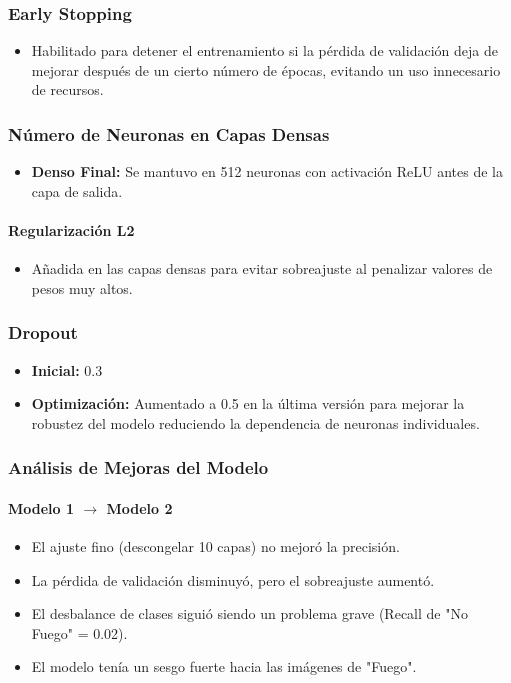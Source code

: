 \subsubsection{Early Stopping}
\begin{itemize}
    \item Habilitado para detener el entrenamiento si la pérdida de validación deja de mejorar después de un cierto número de épocas, evitando un uso innecesario de recursos.
\end{itemize}

\subsubsection{Número de Neuronas en Capas Densas}
\begin{itemize}
    \item \textbf{Denso Final:} Se mantuvo en 512 neuronas con activación ReLU antes de la capa de salida.
\end{itemize}

\paragraph{Regularización L2}
\begin{itemize}
    \item Añadida en las capas densas para evitar sobreajuste al penalizar valores de pesos muy altos.
\end{itemize}

\subsubsection{Dropout}
\begin{itemize}
    \item \textbf{Inicial:} 0.3
    \item \textbf{Optimización:} Aumentado a 0.5 en la última versión para mejorar la robustez del modelo reduciendo la dependencia de neuronas individuales.
\end{itemize}

\subsubsection{Análisis de Mejoras del Modelo}

\paragraph{Modelo 1 $\rightarrow$ Modelo 2}
\begin{itemize}
    \item El ajuste fino (descongelar 10 capas) no mejoró la precisión.
    \item La pérdida de validación disminuyó, pero el sobreajuste aumentó.
    \item El desbalance de clases siguió siendo un problema grave (Recall de "No Fuego" = 0.02).
    \item El modelo tenía un sesgo fuerte hacia las imágenes de "Fuego".
\end{itemize}

